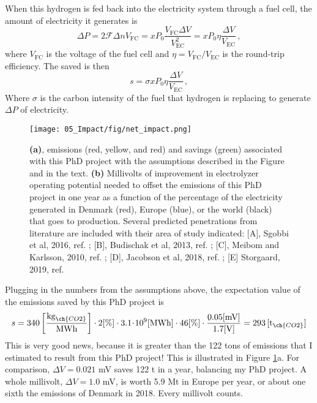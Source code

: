 When this hydrogen is fed back into the electricity system through a fuel cell, the amount of electricity it generates is
\begin{equation}
\Delta P = 2\mathcal{F} \Delta n V_\text{FC} = xP_0 \frac{V_\text{FC}\Delta V}{V_\text{EC}^2} = xP_0\eta \frac{\Delta V}{V_\text{EC}}\,,
\end{equation}
where $V_\text{FC}$ is the voltage of the fuel cell and $\eta = V_\text{FC}/V_\text{EC}$ is the round-trip efficiency. The  saved is then
\begin{equation}
s = \sigma x P_0 \eta \frac{\Delta V}{V_\text{EC}}\,,\label{eq:savings}
\end{equation}
Where $\sigma$ is the carbon intensity of the fuel that hydrogen is replacing to generate $\Delta P$ of electricity.
\begin{figure}[t]
	\texttt{[image: 05\_Impact/fig/net\_impact.png]}
	\caption{\textbf{(a)},  emissions (red, yellow, and red) and savings (green) associated with this PhD project with the assumptions described in the Figure and in the text. \textbf{(b)} Millivolts of improvement in electrolyzer operating potential needed to offset the  emissions of this PhD project in one year as a function of the percentage of the electricity generated in Denmark (red), Europe (blue), or the world (black) that goes to  production. Several predicted  penetrations from literature are included with their area of study indicated: [A], Sgobbi et al, 2016, ref. ; [B], Budischak et al, 2013, ref. ; [C], Meibom and Karlsson, 2010, ref. ; [D], Jacobson et al, 2018, ref. ; [E] Storgaard, 2019, ref. }
	\label{fig:impact}
\end{figure}

Plugging in the numbers from the assumptions above, the expectation value of the  emissions saved by this PhD project is
\begin{equation}
s = 340 \left[\frac{\text{kg}_{\ch{CO2}}}{\text{MWh}}\right] \cdot 2 [\%] \cdot 3.1\!\cdot\! 10^9 \text{[MWh]} \cdot 46 [\%] \cdot \frac{0.05 \text{[mV]}}{1.7 \text{[V]}} = 293 \,[\text{t}_{\ch{CO2}}]
\end{equation}
This is very good news, because it is greater than the 122 tons of  emissions that I estimated to result from this PhD project! This is illustrated in Figure \ref{fig:impact}a. For comparison, $\Delta V = 0.021$ mV saves 122 t in a year, balancing my PhD project. A whole millivolt, $\Delta V = 1.0$ mV, is worth 5.9 Mt in Europe per year, or about one sixth the  emissions of Denmark in 2018. Every millivolt counts.

